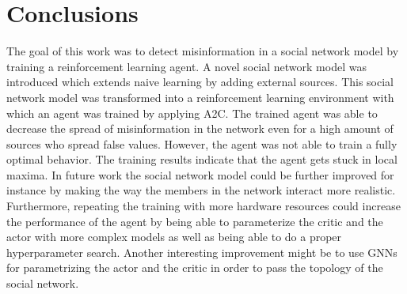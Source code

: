 \documentclass[11pt, a4paper]{article}
\begin{document}
\section{Conclusions}
The goal of this work was to detect misinformation in a social network model by training a reinforcement learning agent. A novel social network model was introduced which extends naive learning by adding external sources. This social network model was transformed into a reinforcement learning environment with which an agent was trained by applying A2C. The trained agent was able to decrease the spread of misinformation in the network even for a high amount of sources who spread false values. However, the agent was not able to train a fully optimal behavior. The training results indicate that the agent gets stuck in local maxima. \newline
In future work the social network model could be further improved for instance by making the way the members in the network interact more realistic. Furthermore, repeating the training with more hardware resources could increase the performance of the agent by being able to parameterize the critic and the actor with more complex models as well as being able to do a proper hyperparameter search. Another interesting improvement might be to use GNNs for parametrizing the actor and the critic in order to pass the topology of the social network.

\clearpage
{}

\end{document}
